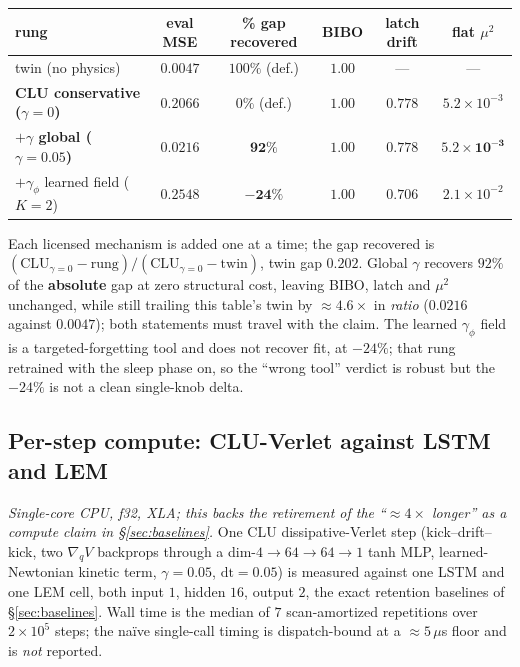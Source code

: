 \documentclass{article}
\begin{document}
\begin{center}\footnotesize
\begin{tabular}{lccccc}
\toprule
rung & eval MSE & \textbf{\% gap recovered} & BIBO & latch drift & flat $\mu^2$ \\
\midrule
twin (no physics) & $0.0047$ & $100\%$ (def.) & $1.00$ & --- & --- \\
\textbf{CLU conservative ($\gamma=0$)} & $0.2066$ & $0\%$ (def.) & $1.00$ & $0.778$ & $5.2{\times}10^{-3}$ \\
\textbf{$+\gamma$ global ($\gamma=0.05$)} & $0.0216$ & $\mathbf{92\%}$ & $\mathbf{1.00}$ & $\mathbf{0.778}$ & $\mathbf{5.2{\times}10^{-3}}$ \\
$+\gamma_\phi$ learned field ($K=2$) & $0.2548$ & $\mathbf{-24\%}$ & $1.00$ & $0.706$ & $2.1{\times}10^{-2}$ \\
\bottomrule
\end{tabular}
\end{center}

Each licensed mechanism is added one at a time; the gap recovered is $(\mathrm{CLU}_{\gamma=0}-\mathrm{rung})/(\mathrm{CLU}_{\gamma=0}-\mathrm{twin})$, twin gap $0.202$. Global $\gamma$ recovers $92\%$ of the \textbf{absolute} gap at zero structural cost, leaving BIBO, latch and $\mu^2$ unchanged, while still trailing this table's twin by $\approx4.6\times$ in \emph{ratio} ($0.0216$ against $0.0047$); both statements must travel with the claim. The learned $\gamma_\phi$ field is a targeted-forgetting tool and does not recover fit, at $-24\%$; that rung retrained with the sleep phase on, so the ``wrong tool'' verdict is robust but the $-24\%$ is not a clean single-knob delta.

\subsection{Per-step compute: CLU-Verlet against LSTM and LEM}\label{app:compute}

\emph{Single-core CPU, f32, XLA; this backs the retirement of the ``$\approx4\times$ longer'' as a compute claim in \S\ref{sec:baselines}.} One CLU dissipative-Verlet step (kick--drift--kick, two $\nabla_qV$ backprops through a dim-$4{\to}64{\to}64{\to}1$ tanh MLP, learned-Newtonian kinetic term, $\gamma{=}0.05$, $\mathrm{dt}{=}0.05$) is measured against one LSTM and one LEM cell, both input $1$, hidden $16$, output $2$, the exact retention baselines of \S\ref{sec:baselines}. Wall time is the median of $7$ scan-amortized repetitions over $2{\times}10^5$ steps; the naïve single-call timing is dispatch-bound at a $\approx5\,\mu$s floor and is \emph{not} reported.
\end{document}
